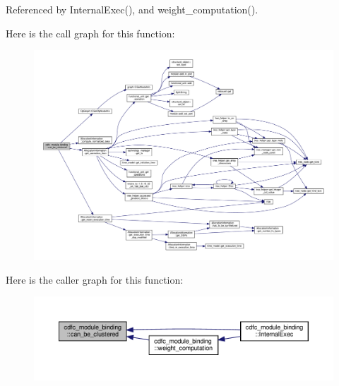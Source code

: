 Referenced by Internal\+Exec(), and weight\+\_\+computation().

Here is the call graph for this function\+:
\nopagebreak
\begin{figure}[H]
\begin{center}
\leavevmode
\includegraphics[width=350pt]{d9/dc4/classcdfc__module__binding_a2986ac32a8bb871de7f5f06cd3cfc4da_cgraph}
\end{center}
\end{figure}
Here is the caller graph for this function\+:
\nopagebreak
\begin{figure}[H]
\begin{center}
\leavevmode
\includegraphics[width=350pt]{d9/dc4/classcdfc__module__binding_a2986ac32a8bb871de7f5f06cd3cfc4da_icgraph}
\end{center}
\end{figure}
\mbox{\label{classcdfc__module__binding_add730ae5e58ed2343e103075cb0c6b12}} 
